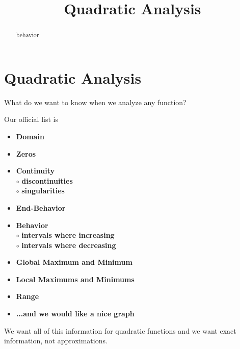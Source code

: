 \documentclass{ximera}
\title{Quadratic Analysis}
\begin{document}
\begin{abstract}
behavior
\end{abstract}
\maketitle




 
 



\section*{Quadratic Analysis}

What do we want to know when we analyze any function?

Our official list is 
\begin{itemize}
     \item \textbf{\textcolor{red!70!black}{Domain}} 
     \item \textbf{\textcolor{red!70!black}{Zeros}} 
     \item \textbf{\textcolor{red!70!black}{Continuity}} \\
     \text{    }$\circ$ \textbf{\textcolor{purple!85!blue}{discontinuities}}\\
     \text{    }$\circ$ \textbf{\textcolor{purple!85!blue}{singularities}}\\
     \item \textbf{\textcolor{red!70!black}{End-Behavior}} 
     \item \textbf{\textcolor{red!70!black}{Behavior}} \\
     \text{    }$\circ$ \textbf{\textcolor{purple!85!blue}{intervals where increasing}}\\
     \text{    }$\circ$ \textbf{\textcolor{purple!85!blue}{intervals where decreasing}}\\
     \item \textbf{\textcolor{red!70!black}{Global Maximum and Minimum}} 
     \item \textbf{\textcolor{red!70!black}{Local Maximums and Minimums}} 
     \item \textbf{\textcolor{red!70!black}{Range}} 
     \item \textbf{\textcolor{blue!55!black}{...and we would like a nice graph}} 
\end{itemize}

We want all of this information for quadratic functions and we want exact information, not approximations. 
\end{document}
